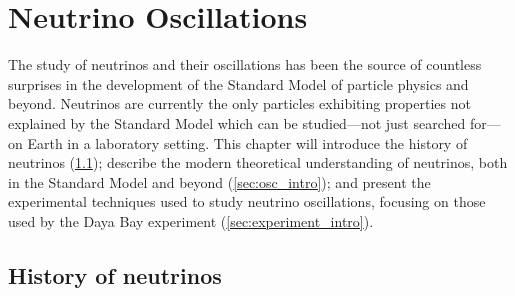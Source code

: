 \chapter{Neutrino Oscillations}
\label{ch:intro}

The study of neutrinos and their oscillations has been the source
of countless surprises in the development of the
Standard Model of particle physics and beyond.
Neutrinos are currently the only particles exhibiting properties
not explained by the Standard Model
which can be studied---not just searched for---on Earth in a laboratory setting.
This chapter will introduce the history of neutrinos (\cref{sec:history});
describe the modern theoretical understanding of neutrinos,
both in the Standard Model and beyond (\cref{sec:osc_intro});
and present the experimental techniques used to study neutrino oscillations,
focusing on those used by the Daya Bay experiment (\cref{sec:experiment_intro}).


\section{History of neutrinos}
\label{sec:history}

